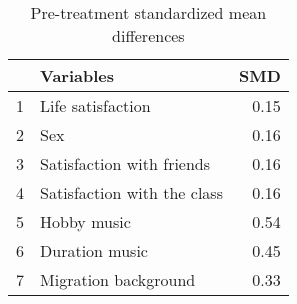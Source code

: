 \begin{table}[ht]
\centering
\begin{tabular}{rlr}
  \hline
 & Variables & SMD \\ 
  \hline
1 & Life satisfaction & 0.15 \\ 
  2 & Sex & 0.16 \\ 
  3 & Satisfaction with friends & 0.16 \\ 
  4 & Satisfaction with the class & 0.16 \\ 
  5 & Hobby music & 0.54 \\ 
  6 & Duration music & 0.45 \\ 
  7 & Migration background & 0.33 \\ 
   \hline
\end{tabular}
\caption{Pre-treatment standardized mean differences} 
\end{table}
